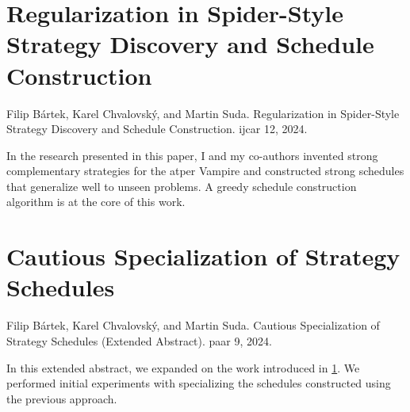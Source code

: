 
\section{Regularization in Spider-Style Strategy Discovery and Schedule Construction}
\label{sec:results:regularization}

Filip Bártek, Karel Chvalovský, and Martin Suda.
Regularization in Spider-Style Strategy Discovery and Schedule Construction.
\Acrlong{ijcar} 12, 2024.
\cite{DBLP:conf/ijcar/BartekCS24}

In the research presented in this paper,
I and my co-authors invented strong complementary strategies for the \gls{atper} Vampire and constructed strong schedules that generalize well to unseen problems.
A greedy schedule construction algorithm is at the core of this work.


\section{Cautious Specialization of Strategy Schedules}
\label{sec:results:cautious}

Filip Bártek, Karel Chvalovský, and Martin Suda.
Cautious Specialization of Strategy Schedules (Extended Abstract).
\Acrlong{paar} 9, 2024.
\cite{DBLP:conf/paar/BartekC024}

In this extended abstract, we expanded on the work introduced in \cref{sec:results:regularization}.
We performed initial experiments with specializing the schedules constructed using the previous approach.

